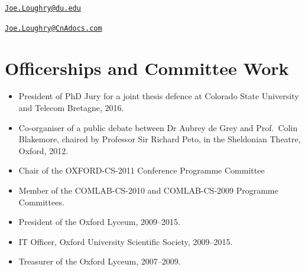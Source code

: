 \documentclass[12pt,twoside,letterpaper]{article}
\begin{document}


\vspace{-10mm}


\vspace{-7mm}


\vspace{-7mm}


\newpage


\vspace*{-23mm}\hfill\href{mailto:Joe.Loughry@du.edu}%
{\nolinkurl{Joe.Loughry@du.edu}}

\vspace*{-7mm}


\vspace{-7mm}


\vspace{-7mm}


\vspace{-7mm}


\vspace{-7mm}


\vspace{-7mm}


\vspace{3mm}

\noindent


\newpage


\vspace*{-23mm}\hfill\href{mailto:Joe.Loughry@CnAdocs.com}%
{\nolinkurl{Joe.Loughry@CnAdocs.com}}

\vspace{-3mm}
\section*{Officerships and Committee Work}
\vspace{-2mm}

\begin{itemize}
    \item President of PhD Jury for a joint thesis defence at Colorado
        State University and Telecom Bretagne, 2016.
	\item Co-organiser of a public debate between Dr Aubrey de Grey
		and Prof.\ Colin Blakemore, chaired by Professor Sir Richard
		Peto, in the Sheldonian Theatre, Oxford, 2012.
	\item Chair of the OXFORD-CS-2011 Conference Programme Committee
	\item Member of the COMLAB-CS-2010 and COMLAB-CS-2009 Programme
		Committees.
	\item President of the Oxford Lyceum, 2009--2015.
	\item IT Officer, Oxford University Scientific Society, 2009--2015.
	\item Treasurer of the Oxford Lyceum, 2007--2009.
\end{itemize}
\end{document}
